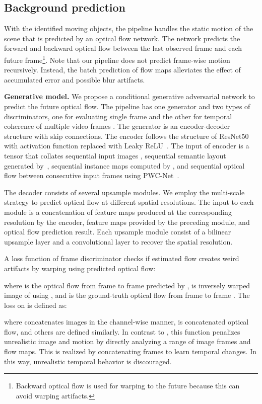 \documentclass[10pt,twocolumn,letterpaper]{article}
\begin{document}
\subsection{Background prediction}
With the identified moving objects, the pipeline handles the static motion of the scene that is predicted by an optical flow network. The network predicts the forward and backward optical flow between the last observed frame  and each future frame\footnote{Backward optical flow is used for warping  to the future because this can avoid warping artifacts.}. Note that our pipeline does not predict frame-wise motion recursively. Instead, the batch prediction of flow maps alleviates the effect of accumulated error and possible blur artifacts.

\vspace{2mm}
\noindent\textbf{Generative model.}
We propose a conditional generative adversarial network to predict the future optical flow. The pipeline has one generator  and two types of discriminators, one for evaluating single frame  and the other for temporal coherence of multiple video frames . 
The generator  is an encoder-decoder structure with skip connections. The encoder follows the structure of ResNet50~\cite{resnet} with activation function replaced with Leaky ReLU~\cite{maas2013rectifier}. 
The input of encoder is a tensor that collates sequential input images , sequential semantic layout  generated by~\cite{semantic_cvpr19}, sequential instance maps  computed by \cite{xiong19upsnet}, and sequential optical flow between consecutive input frames  using PWC-Net~\cite{Sun2018PWC-Net}. 

The decoder consists of several upsample modules. We employ the multi-scale strategy to predict optical flow at different spatial resolutions. The input to each module is a concatenation of feature maps produced at the corresponding resolution by the encoder, feature maps provided by the preceding module, and optical flow prediction result. Each upsample module consist of a bilinear upsample layer and a convolutional layer to recover the spatial resolution.

A loss function of frame discriminator  checks if estimated flow creates weird artifacts by warping  using predicted optical flow:

where  is the optical flow from frame  to frame  predicted by ,  is inversely warped image of  using , and  is the ground-truth optical flow from frame  to frame . The loss  on  is defined as:

where  concatenates images  in the channel-wise manner,  is concatenated optical flow, and others are defined similarly.
In contrast to , this function penalizes unrealistic image and motion by directly analyzing a range of image frames and flow maps. This is realized by concatenating frames to learn temporal changes. In this way, unrealistic temporal behavior is discouraged.
\end{document}
